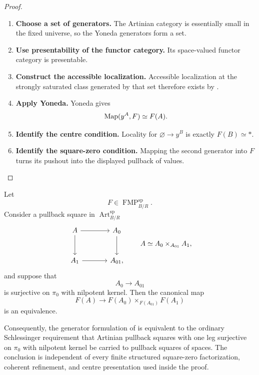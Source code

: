 \begin{proof}
\leavevmode
\begin{enumerate}[label=\textup{(\arabic*)}]
    \item \textbf{Choose a set of generators.}
    The Artinian category is essentially small in the fixed universe, so the
    Yoneda generators form a set.
    \item \textbf{Use presentability of the functor category.}
    Its space-valued functor category is
    presentable.
    \item \textbf{Construct the accessible localization.}
    Accessible localization at the strongly saturated class generated by that set
    therefore exists by
    \cite[Proposition~5.5.4.15]{LurieHigherToposTheory}.
    \item \textbf{Apply Yoneda.}
    Yoneda gives
    \[
        \operatorname{Map}(y^A,F)\simeq F(A).
    \]
    \item \textbf{Identify the centre condition.}
    Locality for \(\varnothing\to y^B\) is exactly \(F(B)\simeq *\).
    \item \textbf{Identify the square-zero condition.}
    Mapping the
    second generator into \(F\) turns its pushout into the displayed pullback of
    values.
\end{enumerate}
\end{proof}


\begin{proposition}
\label{prop:formal-moduli-finite-excision}
Let
\[
    F\in\operatorname{FMP}^{\mathrm{sp}}_{B/R}.
\]
Consider a pullback square in
\(\operatorname{Art}^{\mathrm{sp}}_{B/R}\)
\[
\begin{tikzcd}[column sep=large,row sep=large]
    A \arrow[r] \arrow[d]
        & A_0 \arrow[d]
    \\
    A_1 \arrow[r]
        & A_{01},
\end{tikzcd}
\qquad
A\simeq A_0\times_{A_{01}}A_1,
\]
and suppose that
\[
    A_0\longrightarrow A_{01}
\]
is surjective on \(\pi_0\) with nilpotent kernel. Then the canonical map
\[
    F(A)
    \longrightarrow
    F(A_0)
    \times_{F(A_{01})}
    F(A_1)
\]
is an equivalence.

Consequently, the generator formulation of
 is equivalent to the ordinary
Schlessinger requirement that Artinian pullback squares with one leg surjective on \(\pi_0\) with nilpotent kernel
be carried to pullback squares of spaces. The conclusion is independent of
every finite structured square-zero factorization, coherent refinement, and centre
presentation used inside the proof.
\end{proposition}

